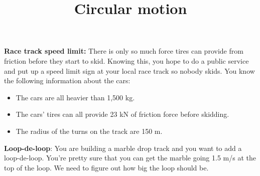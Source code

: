 \documentclass{handout}
\title{Circular motion}
\begin{document}
\maketitle

\hwinstructions

\begin{questions}
    \question \textbf{Race track speed limit:} There is only so much force tires can provide from friction before they start to skid. Knowing this, you hope to do a public service and put up a speed limit sign at your local race track so nobody skids. You know the following information about the cars:
    \begin{itemize}
        \item The cars are all heavier than 1,500 kg.
        \item The cars' tires can all provide 23 kN of friction force before skidding.
        \item The radius of the turns on the track are 150 m.
    \end{itemize}

    \question \textbf{Loop-de-loop}: You are building a marble drop track and you want to add a loop-de-loop. You're pretty sure that you can get the marble going 1.5 m/s at the top of the loop. We need to figure out how big the loop should be.
    \begin{parts}

\end{parts}
\end{questions}
\end{document}
